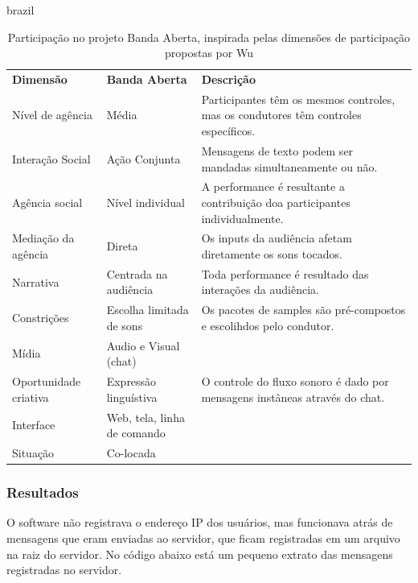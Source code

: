 \begin{otherlanguage*}{brazil}
\begin{table}[ht!]
\ABNTEXfontereduzida
\setlength\extrarowheight{-2pt}
\caption{Participação no projeto Banda Aberta, inspirada pelas dimensões de participação propostas por Wu \cite{wu2017open}}{%
\begin{tabular}{p{3cm}p{3cm}p{4cm}}
\hline
\textbf{Dimensão } & \textbf{Banda Aberta} & \textbf{Descrição} \\
Nível de agência & Média & Participantes têm os mesmos controles, mas os condutores têm controles específicos.\\
Interação Social & Ação Conjunta & Mensagens de texto podem ser mandadas simultaneamente ou não.\\
Agência social  & Nível individual & A performance é resultante a contribuição doa participantes individualmente.\\
Mediação da agência & Direta & Os inputs da audiência afetam diretamente os sons tocados. \\
Narrativa & Centrada na audiência & Toda performance é resultado das interações da audiência.\\
Constrições & Escolha limitada de sons & Os pacotes de samples são pré-compostos e escolihdos pelo condutor.\\
Mídia & Audio e Visual (chat) & \\
Oportunidade criativa & Expressão linguístiva & O controle do fluxo sonoro é dado por mensagens instâneas através do chat.\\
Interface & Web, tela, linha de comando & \\
Situação & Co-locada & \\
\hline
\end{tabular}}
\label{tab:participation}
\end{table}

\newpage

\subsubsection{Resultados}

O software não registrava o endereço IP dos usuários, mas funcionava atrás de mensagens que eram enviadas ao servidor, que ficam registradas em um arquivo na raiz do servidor. No código abaixo está um pequeno extrato das mensagens registradas no servidor. 


\begin{verbatim}


\end{verbatim}
\end{otherlanguage*}
